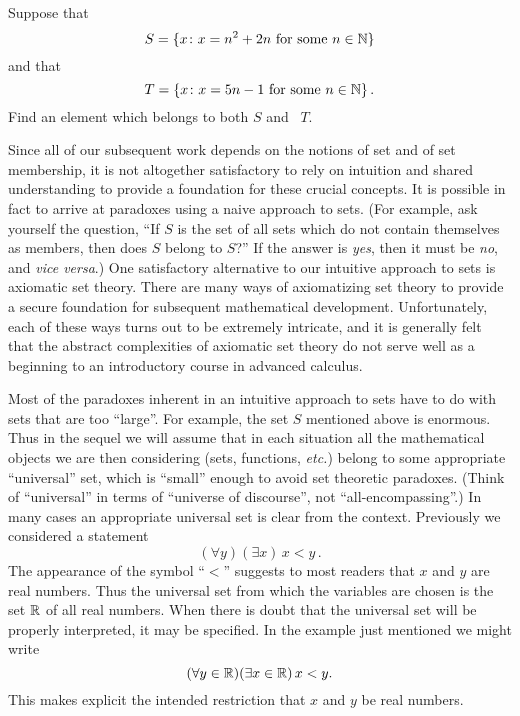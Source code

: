 \begin{prob} Suppose that
  \[ S = \{x \colon x = n^2 + 2n \text{ for some $n \in \mathbb{N}$}\} \]
and that
  \[ T = \{x\colon x = 5n - 1 \text{ for some $n \in \mathbb{N}$}\}\,. \]
Find an element which belongs to both $S$ and ~$T$.
\end{prob}

Since all of our subsequent work depends on the notions of set and of set membership, it is
not altogether satisfactory to rely on intuition and shared understanding to provide a
foundation for these crucial concepts. It is possible in fact to arrive at paradoxes using a
naive approach to sets. (For example, ask yourself the question, ``If $S$ is the set of all
sets which do not contain themselves as members, then does $S$ belong to $S$?'' If the answer
is \emph{yes}, then it must be \emph{no}, and \emph{vice versa}.)  One satisfactory
alternative to our intuitive approach to sets is axiomatic set theory.  There are many ways of
axiomatizing set theory to provide a secure foundation for subsequent mathematical
development.  Unfortunately, each of these ways turns out to be extremely intricate, and it is
generally felt that the abstract complexities of axiomatic set theory do not serve well as a
beginning to an introductory course in advanced calculus.

Most of the paradoxes inherent in an intuitive approach to sets have to do with sets that are
too ``large''. For example, the set $S$ mentioned above is enormous. Thus in the sequel we
will assume that in each situation all the mathematical objects we are then considering (sets,
functions, \emph{etc.}) belong to some appropriate ``universal'' set, which is ``small''
enough to avoid set theoretic paradoxes. (Think of ``universal'' in terms of ``universe of
discourse'', not ``all-encompassing''.)  In many cases an appropriate universal set is clear
from the context. Previously we considered a statement
    \[ (\forall y)(\exists x)\, x < y\,. \]
The appearance of the symbol ``$<$'' suggests to most readers that $x$ and $y$ are real
numbers. Thus the universal set from which the variables are chosen is the set $\mathbb{R}$ of all
real numbers. When there is doubt that the universal set will be properly interpreted, it may
be specified. In the example just mentioned we might write
   \[(\forall y \in \mathbb{R})(\exists x \in \mathbb{R})\, x < y.\]
This makes explicit the intended restriction that $x$ and $y$ be real numbers.

